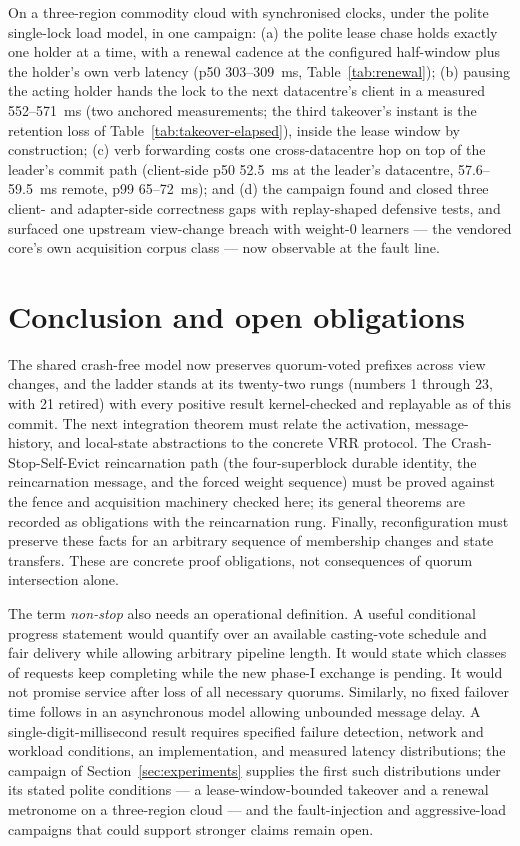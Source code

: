 \documentclass[10pt,journal,letterpaper]{IEEEtran}
\begin{document}
On a three-region commodity cloud with synchronised clocks, under the
polite single-lock load model, in one campaign: (a) the polite lease
chase holds exactly one holder at a time, with a renewal cadence at the
configured half-window plus the holder's own verb latency (p50
303--309~ms, Table~\ref{tab:renewal}); (b) pausing the acting holder
hands the lock to the next datacentre's client in a measured
552--571~ms (two anchored measurements; the third takeover's instant
is the retention loss of Table~\ref{tab:takeover-elapsed}), inside the
lease window by construction; (c) verb forwarding costs one
cross-datacentre hop on top of the leader's commit path (client-side
p50 52.5~ms at the leader's datacentre, 57.6--59.5~ms remote, p99
65--72~ms); and (d) the
campaign found and closed three client- and adapter-side correctness
gaps with replay-shaped defensive tests, and surfaced one upstream
view-change breach with weight-0 learners --- the vendored core's
own acquisition corpus class --- now observable at the fault line.

\section{Conclusion and open obligations}\label{sec:conclusion}
The shared crash-free model now preserves quorum-voted prefixes across
view changes, and the ladder stands at its twenty-two rungs (numbers 1
through 23, with 21 retired) with every
positive result kernel-checked and replayable as of this commit. The next
integration theorem must relate the activation,
message-history, and local-state abstractions to the concrete VRR protocol. The Crash-Stop-Self-Evict reincarnation path (the four-superblock durable
identity, the reincarnation message, and the forced weight sequence) must be
proved against the fence and acquisition machinery checked here; its general
theorems are recorded as obligations with the reincarnation rung. Finally,
reconfiguration must preserve these facts for an arbitrary sequence of
membership changes and state transfers. These are concrete proof obligations,
not consequences of quorum intersection alone.

The term \emph{non-stop} also needs an operational definition. A useful
conditional progress statement would quantify over an available casting-vote
schedule and fair delivery while allowing arbitrary pipeline length. It would
state which classes of requests keep completing while the new phase-I
exchange is pending. It would not promise service after loss of all necessary
quorums. Similarly, no fixed failover time follows in an asynchronous model
allowing unbounded message delay. A single-digit-millisecond result requires
specified failure detection, network and workload conditions, an implementation,
and measured latency distributions; the campaign of
Section~\ref{sec:experiments} supplies the first such distributions under
its stated polite conditions --- a lease-window-bounded takeover and a
renewal metronome on a three-region cloud --- and the fault-injection and
aggressive-load campaigns that could support stronger claims remain open.
\end{document}
